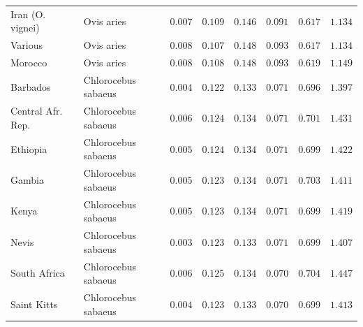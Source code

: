 \documentclass{article}
\begin{document}
\begin{center}
\begin{longtable*}{|l|l|r|r|r|r|r|r|}
            Iran (O. vignei) &          Ovis aries &               $ 0.007$ &                    $ 0.109$ &  $ 0.146$ &            $ 0.091$ &                $ 0.617$ &           $ 1.134$ \\
            Various &          Ovis aries &               $ 0.008$ &                    $ 0.107$ &  $ 0.148$ &            $ 0.093$ &                $ 0.617$ &           $ 1.134$ \\
            Morocco &          Ovis aries &               $ 0.008$ &                    $ 0.108$ &  $ 0.148$ &            $ 0.093$ &                $ 0.619$ &           $ 1.149$ \\
             Barbados & Chlorocebus sabaeus &               $ 0.004$ &                    $ 0.122$ &  $ 0.133$ &            $ 0.071$ &                $ 0.696$ &           $ 1.397$ \\
             Central Afr. Rep. & Chlorocebus sabaeus &               $ 0.006$ &                    $ 0.124$ &  $ 0.134$ &            $ 0.071$ &                $ 0.701$ &           $ 1.431$ \\
             Ethiopia & Chlorocebus sabaeus &               $ 0.005$ &                    $ 0.124$ &  $ 0.134$ &            $ 0.071$ &                $ 0.699$ &           $ 1.422$ \\
             Gambia & Chlorocebus sabaeus &               $ 0.005$ &                    $ 0.123$ &  $ 0.134$ &            $ 0.071$ &                $ 0.703$ &           $ 1.411$ \\
             Kenya & Chlorocebus sabaeus &               $ 0.005$ &                    $ 0.123$ &  $ 0.134$ &            $ 0.071$ &                $ 0.699$ &           $ 1.419$ \\
             Nevis & Chlorocebus sabaeus &               $ 0.003$ &                    $ 0.123$ &  $ 0.133$ &            $ 0.071$ &                $ 0.699$ &           $ 1.407$ \\
             South Africa  & Chlorocebus sabaeus &               $ 0.006$ &                    $ 0.125$ &  $ 0.134$ &            $ 0.070$ &                $ 0.704$ &           $ 1.447$ \\
             Saint Kitts & Chlorocebus sabaeus &               $ 0.004$ &                    $ 0.123$ &  $ 0.133$ &            $ 0.070$ &                $ 0.699$ &           $ 1.413$ \\

\end{longtable*}
\end{center}
\end{document}
